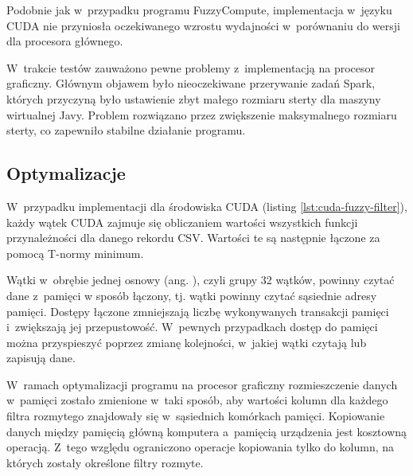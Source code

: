 Podobnie jak w~przypadku programu FuzzyCompute, implementacja w~języku CUDA nie przyniosła
oczekiwanego wzrostu wydajności w~porównaniu do wersji dla procesora głównego.

W~trakcie testów zauważono pewne problemy z~implementacją na procesor graficzny. Głównym objawem
było nieoczekiwane przerywanie zadań Spark, których przyczyną było ustawienie zbyt małego rozmiaru
sterty dla maszyny wirtualnej Javy. Problem rozwiązano przez zwiększenie maksymalnego rozmiaru sterty,
co zapewniło stabilne działanie programu.

\subsection*{Optymalizacje}

W~przypadku implementacji dla środowiska CUDA (listing \ref{lst:cuda-fuzzy-filter}), każdy wątek
CUDA zajmuje się obliczaniem wartości wszystkich funkcji przynależności dla danego rekordu CSV.
Wartości te są następnie łączone za pomocą T-normy minimum.

Wątki w~obrębie jednej osnowy (ang. ), czyli grupy 32 wątków, powinny czytać dane z~pamięci w sposób łączony,
tj. wątki powinny czytać sąsiednie adresy pamięci. Dostępy łączone zmniejszają liczbę wykonywanych
transakcji pamięci i~zwiększają jej przepustowość. W~pewnych przypadkach dostęp do pamięci można
przyspieszyć poprzez zmianę kolejności, w~jakiej wątki czytają lub zapisują dane.

W~ramach optymalizacji programu na procesor graficzny rozmieszczenie danych w~pamięci zostało
zmienione w~taki sposób, aby wartości kolumn dla każdego filtra rozmytego znajdowały się w~sąsiednich
komórkach pamięci.
Kopiowanie danych między pamięcią główną komputera a~pamięcią urządzenia jest kosztowną operacją.
Z~tego względu ograniczono operacje kopiowania tylko do kolumn, na których zostały określone
filtry rozmyte.
\newpage

